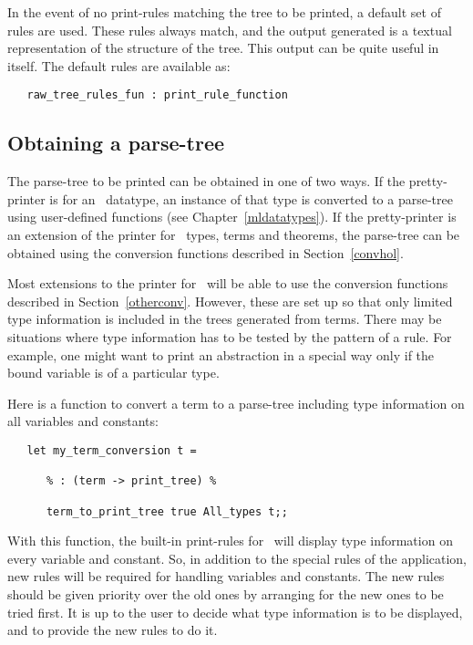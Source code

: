 \noindent
In the event of no print-rules matching the tree to be printed, a default set
of rules are used. These rules always match, and the output generated is a
textual representation of the structure of the tree. This output can be quite
useful in itself. The default rules are available as:

\begin{boxed}\begin{verbatim}
   raw_tree_rules_fun : print_rule_function
\end{verbatim}\end{boxed}


\subsection{Obtaining a parse-tree}

The parse-tree to be printed can be obtained in one of two ways. If the
pretty-printer is for an \ML\ datatype, an instance of that type is converted
to a parse-tree using user-defined functions (see Chapter~\ref{mldatatypes}).
If the pretty-printer is an extension of the printer for \HOL\ types, terms and
theorems, the parse-tree can be obtained using the conversion functions
described in Section~\ref{convhol}.

Most extensions to the printer for \HOL\ will be able to use the conversion
functions described in Section~\ref{otherconv}. However, these are set up so
that only limited type information is included in the trees generated from
terms. There may be situations where type information has to be tested by the
pattern of a rule. For example, one might want to print an abstraction in a
special way only if the bound variable is of a particular type.

Here is a function to convert a term to a parse-tree including type
information on all variables and constants:

\begin{small}\begin{verbatim}
   let my_term_conversion t =

      % : (term -> print_tree) %

      term_to_print_tree true All_types t;;
\end{verbatim}\end{small}

\noindent
With this function, the built-in print-rules for \HOL\ will display type
information on every variable and constant. So, in addition to the special
rules of the application, new rules will be required for handling variables
and constants. The new rules should be given priority over the old ones by
arranging for the new ones to be tried first. It is up to the user to decide
what type information is to be displayed, and to provide the new rules to do
it.


